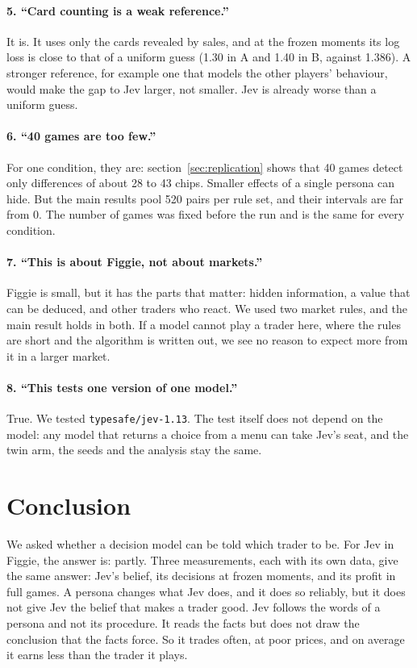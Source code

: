 \documentclass[10pt]{article}
\newcommand{\objection}[1]{\paragraph{#1}}
\begin{document}
\objection{5. ``Card counting is a weak reference.''} It is. It uses only the cards revealed by sales, and at the frozen
moments its log loss is close to that of a uniform guess (1.30 in A and 1.40 in B, against 1.386). A stronger reference, for example one that models the other players' behaviour,
would make the gap to Jev larger, not smaller. Jev is already worse than a uniform guess.

\objection{6. ``40 games are too few.''} For one condition, they are: section~\ref{sec:replication} shows that 40 games
detect only differences of about 28 to 43 chips. Smaller effects of a single persona can hide. But the main results
pool 520 pairs per rule set, and their intervals are far from 0. The number of games was fixed before the run and is
the same for every condition.

\objection{7. ``This is about Figgie, not about markets.''} Figgie is small, but it has the parts that matter: hidden
information, a value that can be deduced, and other traders who react. We used two market rules, and the main result
holds in both. If a model cannot play a trader here, where the rules are short and the algorithm is written out, we see
no reason to expect more from it in a larger market.

\objection{8. ``This tests one version of one model.''} True. We tested \texttt{typesafe/jev-1.13}. The test itself does
not depend on the model: any model that returns a choice from a menu can take Jev's seat, and the twin arm, the seeds
and the analysis stay the same.

\section{Conclusion}\label{sec:conclusion}

We asked whether a decision model can be told which trader to be. For Jev in Figgie, the answer is: partly. Three
measurements, each with its own data, give the same answer: Jev's belief, its decisions at frozen moments, and its
profit in full games. A persona
changes what Jev does, and it does so reliably, but it does not give Jev the belief that makes a trader good. Jev
follows the words of a persona and not its procedure. It reads the facts but does not draw the conclusion that the
facts force. So it trades often, at poor prices, and on average it earns less than the trader it plays.
\end{document}
